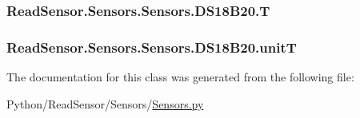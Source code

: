 \subsubsection[{\texorpdfstring{T}{T}}]{\setlength{\rightskip}{0pt plus 5cm}Read\+Sensor.\+Sensors.\+Sensors.\+D\+S18\+B20.\+T}\hypertarget{classReadSensor_1_1Sensors_1_1Sensors_1_1DS18B20_ac16de12d6071752c317827bdcb2b9462}{}\label{classReadSensor_1_1Sensors_1_1Sensors_1_1DS18B20_ac16de12d6071752c317827bdcb2b9462}
\subsubsection[{\texorpdfstring{unitT}{unitT}}]{\setlength{\rightskip}{0pt plus 5cm}Read\+Sensor.\+Sensors.\+Sensors.\+D\+S18\+B20.\+unitT}\hypertarget{classReadSensor_1_1Sensors_1_1Sensors_1_1DS18B20_a6e755c7e5e31b296e06e1825b6b53616}{}\label{classReadSensor_1_1Sensors_1_1Sensors_1_1DS18B20_a6e755c7e5e31b296e06e1825b6b53616}


The documentation for this class was generated from the following file\+:\begin{DoxyCompactItemize}
\item 
Python/\+Read\+Sensor/\+Sensors/\hyperlink{Sensors_8py}{Sensors.\+py}\end{DoxyCompactItemize}
